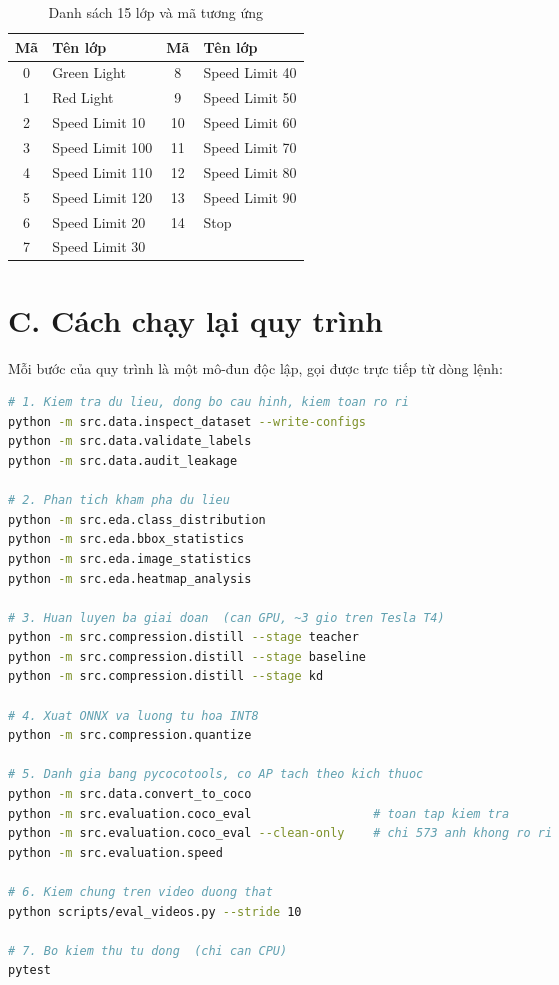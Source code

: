 \begin{table}[H]
\centering
\caption{Danh sách 15 lớp và mã tương ứng}
\label{tab:danhsachlop}
\small
\begin{tabular}{clcl}
\toprule
\textbf{Mã} & \textbf{Tên lớp} & \textbf{Mã} & \textbf{Tên lớp} \\
\midrule
0 & Green Light      & 8  & Speed Limit 40 \\
1 & Red Light        & 9  & Speed Limit 50 \\
2 & Speed Limit 10   & 10 & Speed Limit 60 \\
3 & Speed Limit 100  & 11 & Speed Limit 70 \\
4 & Speed Limit 110  & 12 & Speed Limit 80 \\
5 & Speed Limit 120  & 13 & Speed Limit 90 \\
6 & Speed Limit 20   & 14 & Stop \\
7 & Speed Limit 30   &    & \\
\bottomrule
\end{tabular}
\end{table}

\section*{C. Cách chạy lại quy trình}

Mỗi bước của quy trình là một mô-đun độc lập, gọi được trực tiếp từ dòng lệnh:

\begin{lstlisting}[language=bash, caption={Các lệnh chạy lại quy trình}, label={lst:cmds}]
# 1. Kiem tra du lieu, dong bo cau hinh, kiem toan ro ri
python -m src.data.inspect_dataset --write-configs
python -m src.data.validate_labels
python -m src.data.audit_leakage

# 2. Phan tich kham pha du lieu
python -m src.eda.class_distribution
python -m src.eda.bbox_statistics
python -m src.eda.image_statistics
python -m src.eda.heatmap_analysis

# 3. Huan luyen ba giai doan  (can GPU, ~3 gio tren Tesla T4)
python -m src.compression.distill --stage teacher
python -m src.compression.distill --stage baseline
python -m src.compression.distill --stage kd

# 4. Xuat ONNX va luong tu hoa INT8
python -m src.compression.quantize

# 5. Danh gia bang pycocotools, co AP tach theo kich thuoc
python -m src.data.convert_to_coco
python -m src.evaluation.coco_eval                 # toan tap kiem tra
python -m src.evaluation.coco_eval --clean-only    # chi 573 anh khong ro ri
python -m src.evaluation.speed

# 6. Kiem chung tren video duong that
python scripts/eval_videos.py --stride 10

# 7. Bo kiem thu tu dong  (chi can CPU)
pytest
\end{lstlisting}

